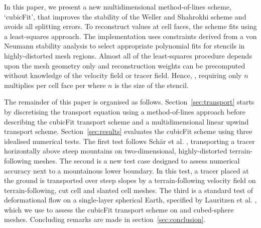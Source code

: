 In this paper, we present a new multidimensional method-of-lines scheme, `cubicFit', that improves the stability of the Weller and Shahrokhi scheme \citep{weller-shahrokhi2014} and avoids all splitting errors.  To reconstruct values at cell faces, the scheme fits  using a least-squares approach.  The implementation uses constraints derived from a von Neumann stability analysis to select appropriate polynomial fits for stencils in highly-distorted mesh regions.  Almost all of the least-squares procedure depends upon the mesh geometry only and reconstruction weights can be precomputed without knowledge of the velocity field or tracer field.
Hence, , requiring only $n$ multiplies per cell face per  where $n$ is the size of the stencil.  

The remainder of this paper is organised as follows.
Section~\ref{sec:transport} starts by discretising the transport equation using a method-of-lines approach before describing the cubicFit transport scheme and a multidimensional linear upwind transport scheme.
Section~\ref{sec:results} evaluates the cubicFit scheme using three idealised numerical tests.
The first test follows Sch\"ar et al. \citep{schaer2002}, transporting a tracer horizontally above steep mountains on two-dimensional, highly-distorted terrain-following meshes.
The second is a new test case designed to assess numerical accuracy next to a mountainous lower boundary.  In this test, a tracer placed at the ground is transported over steep slopes by a terrain-following velocity field on terrain-following, cut cell and slanted cell meshes.
The third is a standard test of deformational flow on a single-layer spherical Earth, specified by Lauritzen et al. \citep{lauritzen2012}, which we use to assess the cubicFit transport scheme on  and cubed-sphere meshes.
Concluding remarks are made in section~\ref{sec:conclusion}.


